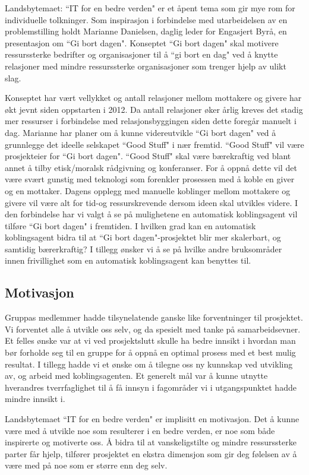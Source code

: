 Landsbytemaet: ``IT for en bedre verden" er et åpent tema som gir mye rom for individuelle tolkninger. Som inspirasjon i forbindelse med utarbeidelsen av en problemstilling holdt Marianne Danielsen, daglig leder for Engasjert Byrå, en presentasjon om ``Gi bort dagen". Konseptet ``Gi bort dagen" skal motivere ressurssterke bedrifter og organisasjoner til å ``gi bort en dag" ved å knytte relasjoner med mindre ressurssterke organisasjoner som trenger hjelp av ulikt slag.

Konseptet har vært vellykket og antall relasjoner mellom mottakere og givere har økt jevnt siden oppstarten i 2012. Da antall relasjoner øker årlig kreves det stadig mer ressurser i forbindelse med relasjonsbyggingen siden dette foregår manuelt i dag. Marianne har planer om å kunne videreutvikle ``Gi bort dagen" ved å grunnlegge det ideelle selskapet ``Good Stuff" i nær fremtid. ``Good Stuff" vil være prosjekteier for ``Gi bort dagen". ``Good Stuff" skal være bærekraftig ved blant annet å tilby etisk/moralsk rådgivning og konferanser. For å oppnå dette vil det være svært gunstig med teknologi som forenkler prosessen med å koble en giver og en mottaker. Dagens opplegg med manuelle koblinger mellom mottakere og givere vil være alt for tid-og ressurskrevende dersom ideen skal utvikles videre. I den forbindelse har vi valgt å se på mulighetene en automatisk koblingsagent vil tilføre ``Gi bort dagen" i fremtiden. I hvilken grad kan en automatisk koblingsagent bidra til at ``Gi bort dagen"-prosjektet blir mer skalerbart, og samtidig bærerkraftig? I tillegg ønsker vi å se på hvilke andre bruksområder innen frivillighet som en automatisk koblingsagent kan benyttes til.

\subsection{Motivasjon}

Gruppas medlemmer hadde tilsynelatende ganske like forventninger til prosjektet. Vi forventet alle å utvikle oss selv, og da spesielt med tanke på samarbeidsevner. Et felles ønske var at vi ved prosjektslutt skulle ha bedre innsikt i hvordan man bør forholde seg til en gruppe for å oppnå en optimal prosess med et best mulig resultat. I tillegg hadde vi et ønske om å tilegne oss ny kunnskap ved utvikling av, og arbeid med koblingsagenten. Et generelt mål var å kunne utnytte hverandres tverrfaglighet til å få innsyn i fagområder vi i utgangspunktet hadde mindre innsikt i.

Landsbytemaet ``IT for en bedre verden" er implisitt en motivasjon. Det å kunne være med å utvikle noe som resulterer i en bedre verden, er noe som både inspirerte og motiverte oss. Å bidra til at vanskeligstilte og mindre ressurssterke parter får hjelp, tilfører prosjektet en ekstra dimensjon som gir deg følelsen av å være med på noe som er større enn deg selv.

